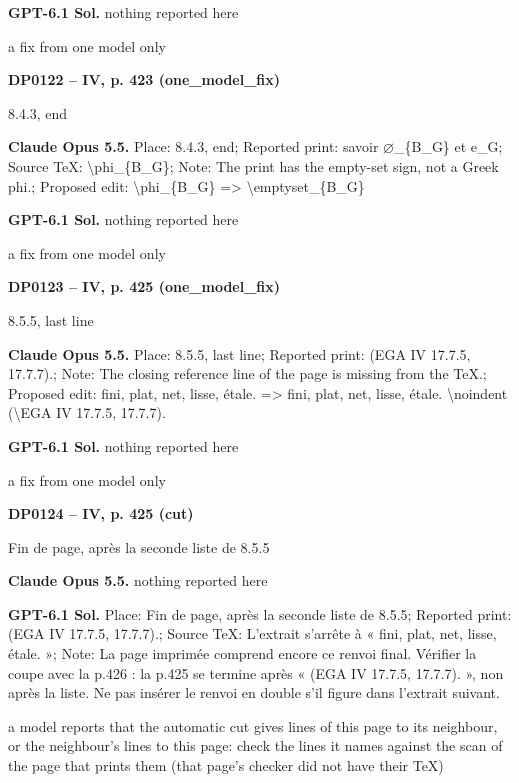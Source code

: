 \textbf{GPT-6.1 Sol.} nothing reported here\par
a fix from one model only\par
\par\noindent\hypertarget{DP0122}{}\textbf{DP0122 -- IV, p. 423 (one\_model\_fix)}\par
8.4.3, end\par
\textbf{Claude Opus 5.5.} Place: 8.4.3, end; Reported print: savoir \ensuremath{\varnothing}\_\{B\_G\} et e\_G; Source TeX: \textbackslash{}phi\_\{B\_G\}; Note: The print has the empty-set sign, not a Greek phi.; Proposed edit: \textbackslash{}phi\_\{B\_G\} =\allowbreak > \textbackslash{}emptyset\_\{B\_G\}\par
\textbf{GPT-6.1 Sol.} nothing reported here\par
a fix from one model only\par
\par\noindent\hypertarget{DP0123}{}\textbf{DP0123 -- IV, p. 425 (one\_model\_fix)}\par
8.5.5, last line\par
\textbf{Claude Opus 5.5.} Place: 8.5.5, last line; Reported print: (EGA IV 17.7.5, 17.7.7).; Note: The closing reference line of the page is missing from the TeX.; Proposed edit: fini, plat, net, lisse, étale. =\allowbreak > fini, plat, net, lisse, étale.  \textbackslash{}noindent (\textbackslash{}EGA IV 17.7.5, 17.7.7).\par
\textbf{GPT-6.1 Sol.} nothing reported here\par
a fix from one model only\par
\par\noindent\hypertarget{DP0124}{}\textbf{DP0124 -- IV, p. 425 (cut)}\par
Fin de page, après la seconde liste de 8.5.5\par
\textbf{Claude Opus 5.5.} nothing reported here\par
\textbf{GPT-6.1 Sol.} Place: Fin de page, après la seconde liste de 8.5.5; Reported print: (EGA IV 17.7.5, 17.7.7).; Source TeX: L'extrait s'arrête à « fini, plat, net, lisse, étale. »; Note: La page imprimée comprend encore ce renvoi final. Vérifier la coupe avec la p.426 : la p.425 se termine après « (EGA IV 17.7.5, 17.7.7). », non après la liste. Ne pas insérer le renvoi en double s'il figure dans l'extrait suivant.\par
a model reports that the automatic cut gives lines of this page to its neighbour, or the neighbour's lines to this page: check the lines it names against the scan of the page that prints them (that page's checker did not have their TeX)\par
